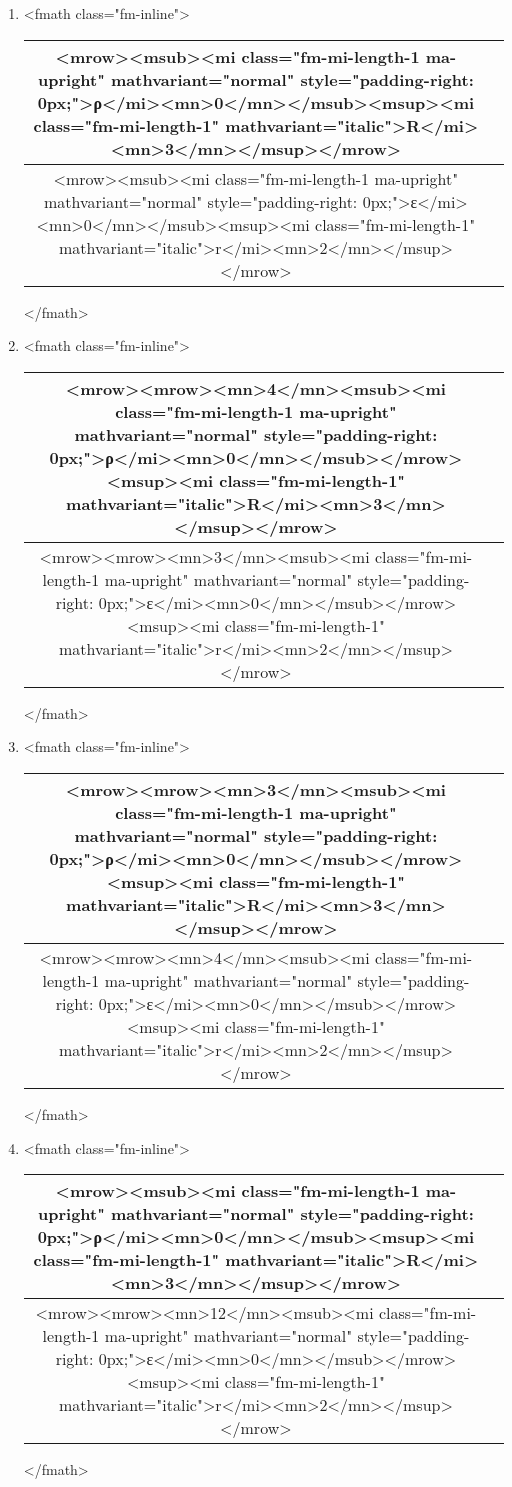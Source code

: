 \documentclass{article}
\begin{document}
\begin{enumerate}[label=(\alph*)]
\item  <fmath class="fm-inline">\begin{tabular}{|c|c|}
\hline
<mrow><msub><mi class="fm-mi-length-1 ma-upright" mathvariant="normal" style="padding-right: 0px;">ρ</mi><mn>0</mn></msub><msup><mi class="fm-mi-length-1" mathvariant="italic">R</mi><mn>3</mn></msup></mrow> \\
\hline
<mrow><msub><mi class="fm-mi-length-1 ma-upright" mathvariant="normal" style="padding-right: 0px;">ε</mi><mn>0</mn></msub><msup><mi class="fm-mi-length-1" mathvariant="italic">r</mi><mn>2</mn></msup></mrow> \\
\hline
\end{tabular}
</fmath>
\item  <fmath class="fm-inline">\begin{tabular}{|c|c|}
\hline
<mrow><mrow><mn>4</mn><msub><mi class="fm-mi-length-1 ma-upright" mathvariant="normal" style="padding-right: 0px;">ρ</mi><mn>0</mn></msub></mrow><msup><mi class="fm-mi-length-1" mathvariant="italic">R</mi><mn>3</mn></msup></mrow> \\
\hline
<mrow><mrow><mn>3</mn><msub><mi class="fm-mi-length-1 ma-upright" mathvariant="normal" style="padding-right: 0px;">ε</mi><mn>0</mn></msub></mrow><msup><mi class="fm-mi-length-1" mathvariant="italic">r</mi><mn>2</mn></msup></mrow> \\
\hline
\end{tabular}
</fmath>
\item  <fmath class="fm-inline">\begin{tabular}{|c|c|}
\hline
<mrow><mrow><mn>3</mn><msub><mi class="fm-mi-length-1 ma-upright" mathvariant="normal" style="padding-right: 0px;">ρ</mi><mn>0</mn></msub></mrow><msup><mi class="fm-mi-length-1" mathvariant="italic">R</mi><mn>3</mn></msup></mrow> \\
\hline
<mrow><mrow><mn>4</mn><msub><mi class="fm-mi-length-1 ma-upright" mathvariant="normal" style="padding-right: 0px;">ε</mi><mn>0</mn></msub></mrow><msup><mi class="fm-mi-length-1" mathvariant="italic">r</mi><mn>2</mn></msup></mrow> \\
\hline
\end{tabular}
</fmath>
\item  <fmath class="fm-inline">\begin{tabular}{|c|c|}
\hline
<mrow><msub><mi class="fm-mi-length-1 ma-upright" mathvariant="normal" style="padding-right: 0px;">ρ</mi><mn>0</mn></msub><msup><mi class="fm-mi-length-1" mathvariant="italic">R</mi><mn>3</mn></msup></mrow> \\
\hline
<mrow><mrow><mn>12</mn><msub><mi class="fm-mi-length-1 ma-upright" mathvariant="normal" style="padding-right: 0px;">ε</mi><mn>0</mn></msub></mrow><msup><mi class="fm-mi-length-1" mathvariant="italic">r</mi><mn>2</mn></msup></mrow> \\
\hline
\end{tabular}
</fmath>
\end{enumerate}
\newpage
\end{document}
